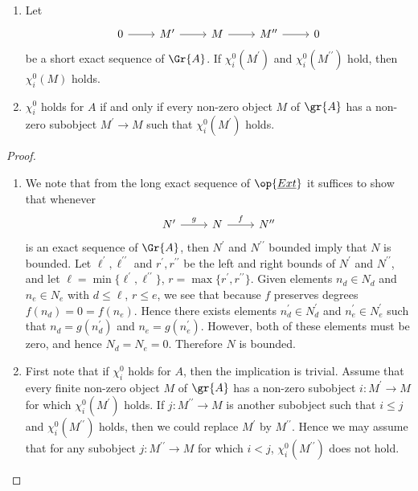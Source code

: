 \begin{prop}
  \begin{prop}
    \begin{enumerate}
    \item
      Let
      $$\begin{tikzcd}
        0 \arrow{r} & M^\prime \arrow{r} & M \arrow{r} & M^{\prime\prime} \arrow{r} & 0
      \end{tikzcd}$$
      be a short exact sequence of $\Gr{A}$.
      If $\chi^0_i(M^\prime)$ and $\chi^0_i(M^{\prime\prime})$ hold, then $\chi^0_i(M)$ holds.
    \item
      $\chi^0_i$ holds for $A$ if and only if every non-zero object $M$ of $\gr{A}$ has a non-zero subobject $M^\prime \rightarrow M$ such that $\chi^0_i(M^\prime)$ holds.
    \end{enumerate}
    \begin{proof}
      \begin{enumerate}
      \item
        We note that from the long exact sequence of $\op{\underline{Ext}}$ it suffices to show that whenever
        $$\begin{tikzcd}
          N^\prime \arrow{r}{g} & N \arrow{r}{f} & N^{\prime\prime}
        \end{tikzcd}$$
        is an exact sequence of $\Gr{A}$, then $N^\prime$ and $N^{\prime\prime}$ bounded imply that $N$ is bounded.
        Let $\ell^\prime, \ell^{\prime\prime}$ and $r^\prime, r^{\prime\prime}$ be the left and right bounds of $N^\prime$ and $N^{\prime\prime}$, and let $\ell = \min\{\ell^\prime, \ell^{\prime\prime}\}$, $r = \max\{r^\prime, r^{\prime\prime}\}$.
        Given elements $n_d \in N_d$ and $n_e \in N_e$ with $d \leq \ell$, $r \leq e$, we see that because $f$ preserves degrees $f(n_d) = 0 = f(n_e)$.
        Hence there exists elements $n^\prime_d \in N^\prime_d$ and $n^\prime_e \in N^\prime_e$ such that $n_d = g(n^\prime_d)$ and $n_e = g(n^\prime_e)$.
        However, both of these elements must be zero, and hence $N_d = N_e = 0$.
        Therefore $N$ is bounded.
      \item
        First note that if $\chi^0_i$ holds for $A$, then the implication is trivial.
        Assume that every finite non-zero object $M$ of $\gr{A}$ has a non-zero subobject $i \colon M^\prime \rightarrow M$ for which $\chi^0_i(M^\prime)$ holds.
        If $j \colon M^{\prime\prime} \rightarrow M$ is another subobject such that $i \leq j$ and  $\chi^0_i(M^{\prime\prime})$ holds, then we could replace $M^\prime$ by $M^{\prime\prime}$.
        Hence we may assume that for any subobject $j \colon M^{\prime\prime} \rightarrow M$ for which $i < j$, $\chi^0_i(M^{\prime\prime})$ does not hold.
        

\end{enumerate}
\end{proof}
\end{prop}
\end{prop}
